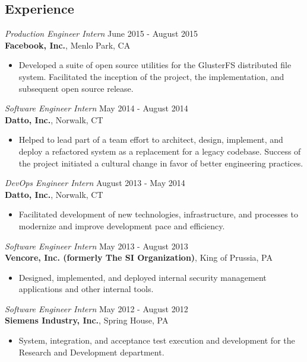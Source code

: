 \documentclass[margin, 10pt]{res}
\begin{document}
\begin{resume}
\section{Experience}

{\sl Production Engineer Intern} \hfill June 2015 - August 2015 \\
\textbf{Facebook, Inc.}, Menlo Park, CA
\begin{itemize}
    \item Developed a suite of open source utilities for the GlusterFS
          distributed file system. Facilitated the inception of the project,
          the implementation, and subsequent open source release.
\end{itemize}

{\sl Software Engineer Intern} \hfill May 2014 - August 2014 \\
\textbf{Datto, Inc.}, Norwalk, CT
\begin{itemize}
    \item Helped to lead part of a team effort to architect, design, implement,
          and deploy a refactored system as a replacement for a legacy
          codebase.
          Success of the project initiated a cultural change in favor of better
          engineering practices.
\end{itemize}

{\sl DevOps Engineer Intern} \hfill August 2013 - May 2014 \\
\textbf{Datto, Inc.}, Norwalk, CT
\begin{itemize}
    \item Facilitated development of new technologies, infrastructure, and
          processes to modernize and improve development pace and efficiency.
\end{itemize}
 
{\sl Software Engineer Intern} \hfill May 2013 - August 2013 \\
\textbf{Vencore, Inc. (formerly The SI Organization)}, King of Prussia, PA
\begin{itemize} 
    \item Designed, implemented, and deployed internal security management
          applications and other internal tools.
\end{itemize} 

{\sl Software Engineer Intern} \hfill May 2012 - August 2012 \\
\textbf{Siemens Industry, Inc.}, Spring House, PA
\begin{itemize}
    \item System, integration, and acceptance test execution and development
          for the Research and Development department.
\end{itemize} 


\end{resume}
\end{document}

